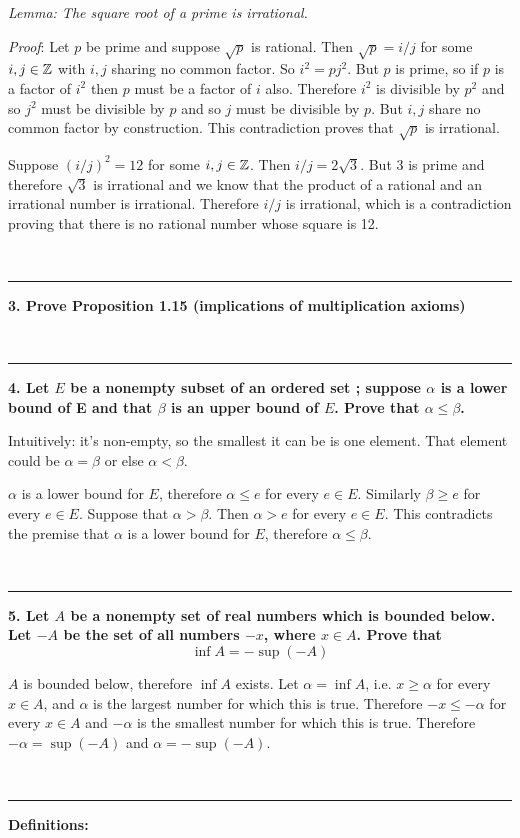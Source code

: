 \textit{Lemma: The square root of a prime is irrational.}

\textit{Proof}: Let $p$ be prime and suppose $\sqrt{p}$ is rational. Then $\sqrt{p} =
i/j$ for some $i, j \in \mathbb{Z}$ with $i,j$ sharing no common factor. So $i^2 =
pj^2$. But $p$ is prime, so if $p$ is a factor of $i^2$ then $p$ must be a
factor of $i$ also. Therefore $i^2$ is divisible by $p^2$ and so $j^2$ must be
divisible by $p$ and so $j$ must be divisible by $p$. But $i,j$ share no common
factor by construction. This contradiction proves that $\sqrt{p}$ is
irrational.

Suppose $(i/j)^2 = 12$ for some $i,j \in \mathbb{Z}$. Then $i/j = 2\sqrt{3}$. But $3$
is prime and therefore $\sqrt{3}$ is irrational and we know that the product of
a rational and an irrational number is irrational. Therefore $i/j$ is
irrational, which is a contradiction proving that there is no rational number
whose square is 12.


~\\\hrule
\textbf{3. Prove Proposition 1.15 (implications of multiplication axioms)}

~\\\hrule
\textbf{4. Let $E$ be a nonempty subset of an ordered set ; suppose $\alpha$ is a
lower bound of E and that $\beta$ is an upper bound of $E$. Prove that $\alpha
\leq \beta$.}

Intuitively: it's non-empty, so the smallest it can be is one element. That
element could be $\alpha = \beta$ or else $\alpha < \beta$.

$\alpha$ is a lower bound for $E$, therefore $\alpha \leq e$ for every $e \in
E$. Similarly $\beta \geq e$ for every $e \in E$. Suppose that $\alpha >
\beta$. Then $\alpha > e$ for every $e \in E$. This contradicts the premise
that $\alpha$ is a lower bound for $E$, therefore $\alpha \leq \beta$.


~\\\hrule
\textbf{5. Let $A$ be a nonempty set of real numbers which is bounded below. Let $-A$
be the set of all numbers $-x$, where $x \in A$. Prove that
$$
\inf A = - \sup(-A)
$$
}

$A$ is bounded below, therefore $\inf A$ exists. Let $\alpha = \inf A$, i.e. $x
\geq \alpha$ for every $x \in A$, and $\alpha$ is the largest number for which
this is true. Therefore $-x \leq -\alpha$ for every $x \in A$ and $-\alpha$ is
the smallest number for which this is true. Therefore $-\alpha=\sup(-A)$ and
$\alpha=-\sup(-A)$.


~\\\hrule
\textbf{Definitions:}

